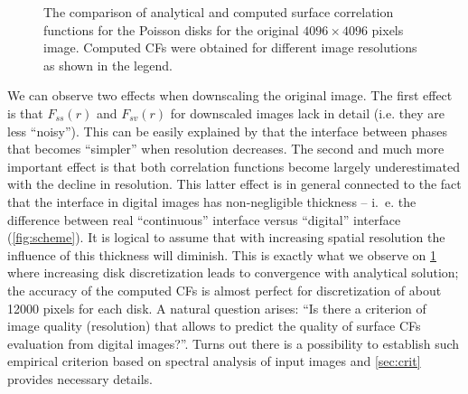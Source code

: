 \documentclass[reprint,amsmath,amssymb,aps,pre]{revtex4-1}
\begin{document}
\begin{figure}[ht]
  \centering
  \hfill
    \caption[]{The comparison of analytical and computed surface correlation
      functions for the Poisson disks for the original $4096 \times 4096$ pixels
      image. Computed CFs were obtained for different image resolutions as shown
      in the legend.}
    \label{fig:scaling}
\end{figure}

We can observe two effects when downscaling the original image. The
first effect is that $F_{ss}(r)$ and $F_{sv}(r)$ for downscaled images lack in
detail (i.e. they are less ``noisy''). This can be easily explained by that the
interface between phases that becomes ``simpler'' when resolution decreases. The
second and much more important effect is that both correlation functions become
largely underestimated with the decline in resolution. This latter effect is in
general connected to the fact that the interface in digital images has
non-negligible thickness -- i.~e. the difference between real ``continuous''
interface versus ``digital'' interface (\cref{fig:scheme}). It is logical to
assume that with increasing spatial resolution the influence of this thickness
will diminish. This is exactly what we observe on \cref{fig:scaling} where
increasing disk discretization leads to convergence with analytical solution;
the accuracy of the computed CFs is almost perfect for discretization of about
12000 pixels for each disk. A natural question arises: ``Is there a criterion of
image quality (resolution) that allows to predict the quality of surface CFs
evaluation from digital images?''. Turns out there is a possibility to establish
such empirical criterion based on spectral analysis of input images and
\cref{sec:crit} provides necessary details.
\end{document}
